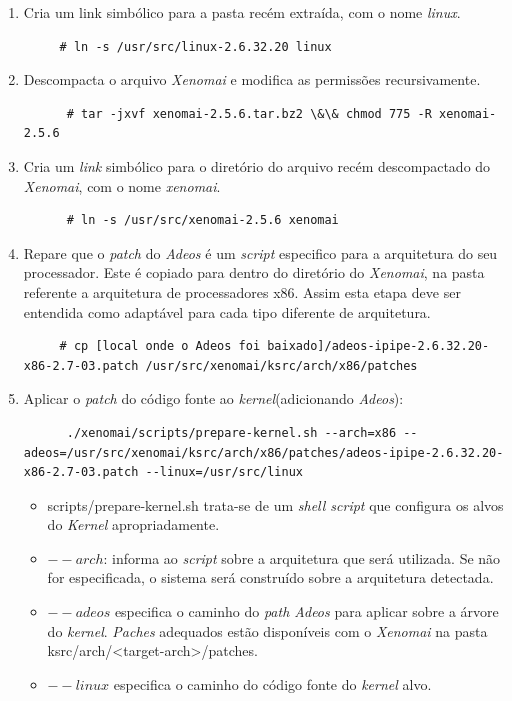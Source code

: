 \documentclass[a4paper,10pt]{article}
\begin{document}
\begin{enumerate}
      \item Cria um link simbólico para a pasta recém extraída, com o nome \emph{linux}.
	\begin{lstlisting}
	 # ln -s /usr/src/linux-2.6.32.20 linux
	\end{lstlisting}
	  
      \item Descompacta o arquivo \emph{Xenomai} e modifica as permissões recursivamente.
	\begin{lstlisting}
	  # tar -jxvf xenomai-2.5.6.tar.bz2 \&\& chmod 775 -R xenomai-2.5.6
	\end{lstlisting}

      \item Cria um \emph{link} simbólico para o diretório do arquivo recém descompactado do \emph{Xenomai}, com o nome \emph{xenomai}.
	\begin{lstlisting}
	  # ln -s /usr/src/xenomai-2.5.6 xenomai
	\end{lstlisting}

      \item Repare que o \emph{patch} do \emph{Adeos} é um \emph{script} especifico para a arquitetura do seu processador. Este é copiado
	    para dentro do diretório do \emph{Xenomai}, na pasta referente a arquitetura de processadores x86. Assim esta etapa deve ser 
	    entendida como adaptável para cada tipo diferente de arquitetura.
	\begin{lstlisting}
	 # cp [local onde o Adeos foi baixado]/adeos-ipipe-2.6.32.20-x86-2.7-03.patch /usr/src/xenomai/ksrc/arch/x86/patches
	\end{lstlisting}
	  
      \item Aplicar o \emph{patch} do código fonte ao \emph{kernel}(adicionando \emph{Adeos}):
	\begin{lstlisting}
	  ./xenomai/scripts/prepare-kernel.sh --arch=x86 --adeos=/usr/src/xenomai/ksrc/arch/x86/patches/adeos-ipipe-2.6.32.20-x86-2.7-03.patch --linux=/usr/src/linux   
	\end{lstlisting}
 
	\begin{itemize}
	  \item  scripts/prepare-kernel.sh trata-se de um \emph{shell script}  que configura os alvos do \emph{Kernel} apropriadamente.
	  \item $--arch$: informa ao \emph{script} sobre a arquitetura que será utilizada. Se não for especificada, o sistema será 
	     construído sobre a arquitetura detectada. 
	  \item $--adeos$ especifica o caminho do \emph{path Adeos} para aplicar sobre a árvore do \emph{kernel}. \emph{Paches} adequados 
	    estão disponíveis com o \emph{Xenomai} na pasta ksrc/arch/<target-arch>/patches.
	  \item $--linux$ especifica o caminho do código fonte do \emph{kernel} alvo. 
	\end{itemize}


\end{enumerate}
\end{document}
